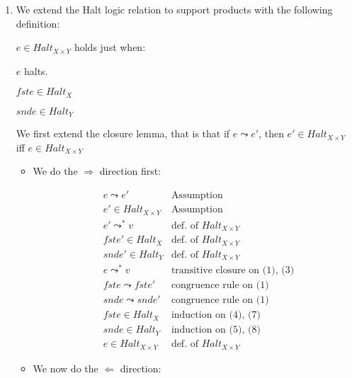 
\usepackage{etoolbox}




\begin{enumerate}

  \item
    We extend the Halt logic relation to support products with the following definition:

    $e \in Halt_{X \times Y}$ holds just when:

    $e$ halts.

    $fst e \in Halt_X$

    $snd e \in Halt_Y$

    We first extend the closure lemma, that is that if $e \leadsto e'$, then $e' \in Halt_{X \times Y}$ iff $e \in Halt_{X \times Y}$


    \begin{itemize}
      \item
        We do the $\Rightarrow$ direction first:

        \begin{align}
          &e \leadsto e' & \text{Assumption}\\
          &e' \in Halt_{X \times Y} & \text{Assumption}\\
          &e' \leadsto^* v & \text{def. of $Halt_{X \times Y}$}\\
          &fst e' \in Halt_X &\text{def. of $Halt_{X \times Y}$}\\
          &snd e' \in Halt_Y &\text{def. of $Halt_{X \times Y}$}\\
          &e \leadsto^* v & \text{transitive closure on (1), (3)}\\
          &fst e \leadsto fst e' & \text{congruence rule on (1)}\\
          &snd e \leadsto snd e' & \text{congruence rule on (1)}\\
          &fst e \in Halt_X &\text{induction on (4), (7)}\\
          &snd e \in Halt_Y &\text{induction on (5), (8)}\\
          &e \in Halt_{X \times Y} &\text{def. of $Halt_{X \times Y}$}
        \end{align}

      \item
        We now do the $\Leftarrow$ direction:


\end{itemize}
\end{enumerate}

